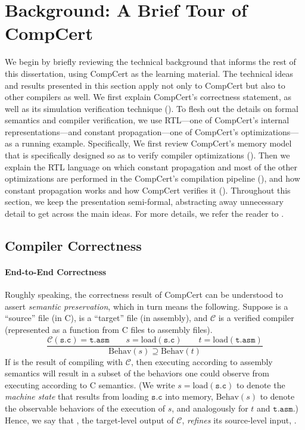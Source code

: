 \section{Background: A Brief Tour of CompCert}
\label{sec:background}

We begin by briefly reviewing the technical background that informs the rest of this dissertation,
using CompCert as the learning material.  The technical ideas and results presented in this section
apply not only to CompCert but also to other compilers as well.  We first explain CompCert's
correctness statement, as well as its simulation verification technique
().  To flesh out the details on formal semantics and compiler
verification, we use RTL---one of CompCert's internal representations---and constant
propagation---one of CompCert's optimizations---as a running example.  Specifically, We first review
CompCert's memory model that is specifically designed so as to verify compiler optimizations
().  Then we explain the RTL language on which constant propagation and
most of the other optimizations are performed in the CompCert's compilation pipeline
(), and how constant propagation works and how CompCert verifies it
().  Throughout this section, we keep the presentation semi-formal,
abstracting away unnecessary detail to get across the main ideas.  For more details, we refer the
reader to \cite{compcert, compcert-memory-model}.


\subsection{Compiler Correctness}
\label{sec:background:correctness}

\paragraph{End-to-End Correctness}

Roughly speaking, the correctness result of CompCert can be understood to assert \emph{semantic
  preservation}, which in turn means the following.  Suppose  is a ``source'' file (in C),
 is a ``target'' file (in assembly), and $\mathcal{C}$ is a verified compiler
(represented as a function from C files to assembly files).
\[
\frac{
\mathcal{C}(\mathtt{s.c}) = \mathtt{t.asm} \qquad
s = \mathrm{load}(\mathtt{s.c})\qquad
t = \mathrm{load}(\mathtt{t.asm})}
{\mathrm{Behav}(s) \supseteq \mathrm{Behav}(t)}
\]
If  is the result of compiling  with $\mathcal{C}$, then executing
 according to assembly semantics will result in a subset of the behaviors one could
observe from executing  according to C semantics.  (We write
$s = \mathrm{load}(\mathtt{s.c})$ to denote the \emph{machine state} that results from loading
$\mathtt{s.c}$ into memory, $\mathrm{Behav}(s)$ to denote the observable behaviors of the execution
of $s$, and analogously for $t$ and $\mathtt{t.asm}$.)  Hence, we say that , the
target-level output of $\mathcal{C}$, \emph{refines} its source-level input, .

